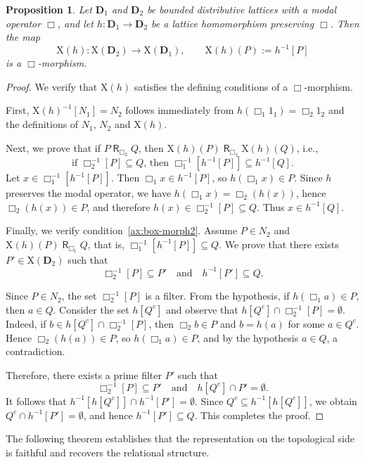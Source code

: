 \documentclass[10pt,a4paper]{amsart}
\newtheorem{proposition}[theorem]{Proposition}
\DeclareMathOperator{\R}{\mathsf{R}}
\newcommand{\D}{\mathbf{D}}
\begin{document}
\begin{proposition}
\label{prop:Xh-box-morphism}
Let $\D_1$ and $\D_2$ be bounded distributive lattices with a modal operator $\Box$, and let $h \colon \D_1 \to \D_2$ be a lattice homomorphism preserving $\Box$. Then the map
\[
\mathrm{X}(h) \colon \mathrm{X}(\D_2) \to \mathrm{X}(\D_1), \qquad \mathrm{X}(h)(P) := h^{-1}[P]
\]
is a $\Box$-morphism.
\end{proposition}
\begin{proof}
We verify that $\mathrm{X}(h)$ satisfies the defining conditions of a $\Box$-morphism.

First, $\mathrm{X}(h)^{-1}[N_1] = N_2$ follows immediately from $h(\Box_1 1_1) = \Box_2 1_2$ and the definitions of $N_1$, $N_2$ and $\mathrm{X}(h)$.

Next, we prove that if $P\R_{\Box_2}Q$, then $\mathrm{X}(h)(P)\R_{\Box_1} \mathrm{X}(h)(Q)$, i.e., 
\[
\text{if }\Box_2^{-1}[P] \subseteq Q\text{, then }\Box_1^{-1}[h^{-1}[P]] \subseteq h^{-1}[Q].
\]
Let $x \in \Box_1^{-1}[h^{-1}[P]]$. Then $\Box_1 x \in h^{-1}[P]$, so $h(\Box_1 x) \in P$. Since $h$ preserves the modal operator, we have $h(\Box_1 x) = \Box_2(h(x))$, hence $\Box_2(h(x)) \in P$, and therefore $h(x) \in \Box_2^{-1}[P] \subseteq Q$. Thus $x \in h^{-1}[Q]$.

Finally, we verify condition~\eqref{ax:box-morph2}. Assume $P \in N_2$ and $\mathrm{X}(h)(P) \R_{\Box_1} Q$, that is, $\Box_1^{-1}[h^{-1}[P]] \subseteq Q$.
We prove that there exists $P' \in \mathrm{X}(\D_2)$ such that
\[
\Box_2^{-1}[P] \subseteq P' \quad \text{and} \quad h^{-1}[P'] \subseteq Q.
\]

Since $P \in N_2$, the set $\Box_2^{-1}[P]$ is a filter. From the hypothesis, if $h(\Box_1 a) \in P$, then $a \in Q$. Consider the set $h[Q^c]$ and observe that $h[Q^c] \cap \Box_2^{-1}[P] = \emptyset$. Indeed, if $b \in h[Q^c] \cap \Box_2^{-1}[P]$, then $\Box_2 b \in P$ and $b = h(a)$ for some $a \in Q^c$. Hence $\Box_2(h(a)) \in P$, so $h(\Box_1 a) \in P$, and by the hypothesis $a \in Q$, a contradiction.

Therefore, there exists a prime filter $P'$ such that
\[
\Box_2^{-1}[P] \subseteq P' \quad \text{and} \quad h[Q^c] \cap P' = \emptyset.
\]
It follows that $h^{-1}[h[Q^c]] \cap h^{-1}[P'] = \emptyset$. Since $Q^c \subseteq h^{-1}[h[Q^c]]$, we obtain $Q^c \cap h^{-1}[P'] = \emptyset$, and hence $h^{-1}[P'] \subseteq Q$. This completes the proof.
\end{proof}

The following theorem establishes that the representation on the topological side is faithful and recovers the relational structure.
\end{document}

